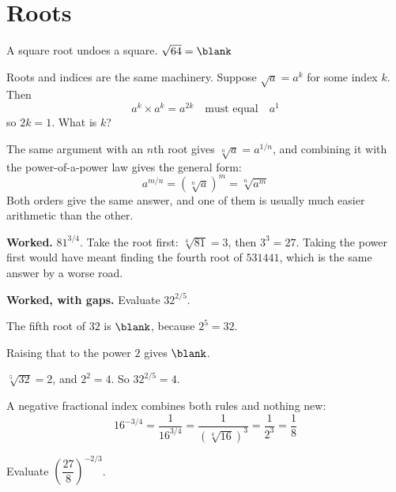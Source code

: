 \section{Roots}
\label{sec:F01-roots}

\begin{fr}
A square root undoes a square. $\sqrt{64} = \blank$
\nextframe
\end{fr}

\begin{fr}
Roots and indices are the same machinery. Suppose $\sqrt{a} = a^{k}$ for some
index $k$. Then
\[ a^{k} \times a^{k} = a^{2k} \quad\text{must equal}\quad a^{1} \]
so $2k = 1$. What is $k$?
\nextframe
\end{fr}

\begin{fr}
The same argument with an $n$th root gives $\sqrt[n]{a} = a^{1/n}$, and
combining it with the power-of-a-power law gives the general form:
\[ a^{m/n} = \left(\sqrt[n]{a}\right)^{m} = \sqrt[n]{a^{m}} \]
Both orders give the same answer, and one of them is usually much easier
arithmetic than the other.

\textbf{Worked.} $81^{3/4}$. Take the root first: $\sqrt[4]{81} = 3$, then
$3^{3} = 27$. Taking the power first would have meant finding the fourth root
of $531441$, which is the same answer by a worse road.
\end{fr}

\begin{fr}
\textbf{Worked, with gaps.} Evaluate $32^{2/5}$.

The fifth root of $32$ is $\blank$, because $2^{5} = 32$.

Raising that to the power $2$ gives $\blank$.
\dotline
\nextframe
\end{fr}

\begin{fr}
\begin{ansblock}
$\sqrt[5]{32} = 2$, and $2^{2} = 4$. So $32^{2/5} = 4$.
\end{ansblock}

A negative fractional index combines both rules and nothing new:
\[ 16^{-3/4} = \frac{1}{16^{3/4}} = \frac{1}{(\sqrt[4]{16})^{3}}
             = \frac{1}{2^{3}} = \frac{1}{8} \]

\yourturn
Evaluate $\left(\dfrac{27}{8}\right)^{-2/3}$.
\dotline
\nextframe
\end{fr}

